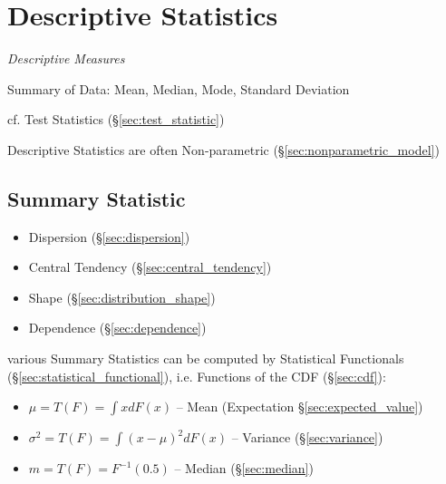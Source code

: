 \section{Descriptive Statistics}\label{sec:descriptive_statistics}

\emph{Descriptive Measures}

Summary of Data: Mean, Median, Mode, Standard Deviation

cf. Test Statistics (\S\ref{sec:test_statistic})

Descriptive Statistics are often Non-parametric
(\S\ref{sec:nonparametric_model})



\subsection{Summary Statistic}\label{sec:summary_statistic}


\begin{itemize}
  \item Dispersion (\S\ref{sec:dispersion})
  \item Central Tendency (\S\ref{sec:central_tendency})
  \item Shape (\S\ref{sec:distribution_shape})
  \item Dependence (\S\ref{sec:dependence})
\end{itemize}

various Summary Statistics can be computed by Statistical Functionals
(\S\ref{sec:statistical_functional}), i.e. Functions of the CDF
(\S\ref{sec:cdf}):
\begin{itemize}
  \item $\mu = T(F) = \int x dF(x)$
    -- Mean (Expectation \S\ref{sec:expected_value})
  \item $\sigma^2 = T(F) = \int (x - \mu)^2 dF(x)$
    -- Variance (\S\ref{sec:variance})
  \item $m = T(F) = F^{-1}(0.5)$
    -- Median (\S\ref{sec:median})
\end{itemize}



